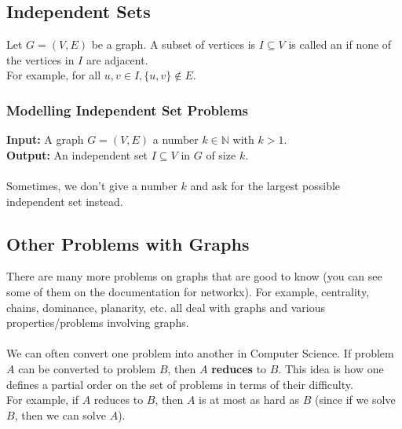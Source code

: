 \documentclass{article}
\begin{document}
\subsection{Independent Sets}
Let $G = (V, E)$ be a graph. A subset of vertices is $I \subseteq V$ is called an  if none of the vertices in $I$ are adjacent.\\
For example, for all $u,v \in I, \{u, v\} \not\in E$.

\subsubsection{Modelling Independent Set Problems}
\textbf{Input: }A graph $G = (V,E)$ a number $k \in \mathbb{N}$ with $k > 1$.\\
\textbf{Output: }An independent set $I \subseteq V$ in $G$ of size $k$.\\
\\
Sometimes, we don't give a number $k$ and ask for the largest possible independent set instead.

\subsection{Other Problems with Graphs}
There are many more problems on graphs that are good to know (you can see some of them on the documentation for networkx).
For example, centrality, chains, dominance, planarity, etc. all deal with graphs and various properties/problems involving graphs.\\
\\
We can often convert one problem into another in Computer Science. If problem $A$ can be converted to problem $B$, then $A$ \textbf{reduces} to $B$. This idea is how one defines a partial order on the set of problems in terms of their difficulty.\\
For example, if $A$ reduces to $B$, then $A$ is at most as hard as $B$ (since if we solve $B$, then we can solve $A$).
\end{document}
